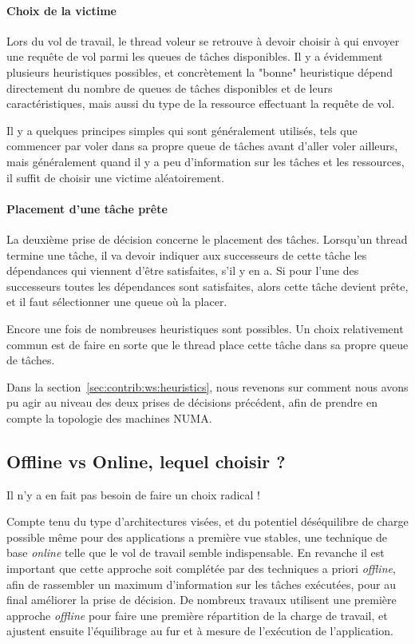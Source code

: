 \paragraph{Choix de la victime}

Lors du vol de travail, le thread voleur se retrouve à devoir choisir à qui envoyer une requête de vol parmi les queues de tâches disponibles.
Il y a évidemment plusieurs heuristiques possibles, et concrètement la "bonne" heuristique dépend directement du nombre de queues de tâches disponibles et de leurs caractéristiques, mais aussi du type de la ressource effectuant la requête de vol.

Il y a quelques principes simples qui sont généralement utilisés, tels que commencer par voler dans sa propre queue de tâches avant d'aller voler ailleurs, mais généralement quand il y a peu d'information sur les tâches et les ressources, il suffit de choisir une victime aléatoirement.

\paragraph{Placement d'une tâche prête}

La deuxième prise de décision concerne le placement des tâches.
Lorsqu'un thread termine une tâche, il va devoir indiquer aux successeurs de cette tâche les dépendances qui viennent d'être satisfaites, s'il y en a.
Si pour l'une des successeurs toutes les dépendances sont satisfaites, alors cette tâche devient prête, et il faut sélectionner une queue où la placer.

Encore une fois de nombreuses heuristiques sont possibles. Un choix relativement commun est de faire en sorte que le thread place cette tâche dans sa propre queue de tâches.


Dans la section~\ref{sec:contrib:ws:heuristics}, nous revenons sur comment nous avons pu agir au niveau des deux prises de décisions précédent, afin de prendre en compte la topologie des machines NUMA.


\subsection{Offline vs Online, lequel choisir ?}

Il n'y a en fait pas besoin de faire un choix radical !

Compte tenu du type d'architectures visées, et du potentiel déséquilibre de charge possible même pour des applications a première vue stables, une technique de base \emph{online} telle que le vol de travail semble indispensable.
En revanche il est important que cette approche soit complétée par des techniques a priori \emph{offline}, afin de rassembler un maximum d'information sur les tâches exécutées, pour au final améliorer la prise de décision.
De nombreux travaux utilisent une première approche \emph{offline} pour faire une première répartition de la charge de travail, et ajustent ensuite l'équilibrage au fur et à mesure de l'exécution de l'application.



